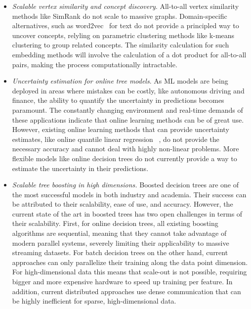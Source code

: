 \begin{itemize}
	\item \emph{Scalable vertex similarity and concept discovery}. All-to-all vertex similarity
	methods like SimRank do not scale to massive graphs. Domain-specific alternatives,
	such as word2vec~\cite{word2vec} for text do not provide a principled way to uncover
	concepts, relyling on parametric clustering methods like k-means clustering to group related
	concepts. The similarity calculation for such embedding methods will involve the
	calculation of a dot product for all-to-all pairs, making the process
	computationally intractable.

	\item \emph{Uncertainty estimation for online tree models}. As ML models are being
	deployed in areas where mistakes can be costly, like autonomous driving and finance,
	the ability to quantify the uncertainty in predictions becomes paramount. The constantly
	changing environment and real-time demands of these applications indicate that
	online learning methods can be of great use. However, existing online learning
	methods that can provide uncertainty estimates, like online quantile linear regression
	~\cite{koenker2005qr}, do not provide the necessary accuracy and cannot deal
	with highly non-linear problems. More flexible models like online decision trees
	do not currently provide a way to estimate the uncertainty in their predictions.

	\item \emph{Scalable tree boosting in high dimensions.} Boosted
	decision trees are one of the most successful models in both industry and academia.
	Their success can be attributed to their scalability, ease of use, and accuracy.
	However, the current state of the art in boosted trees has two open challenges
	in terms of their scalability.
	First, for online decision trees, all existing boosting algorithms are sequential,
	meaning that they cannot take advantage of modern parallel systems, severely limiting
	their applicability to massive streaming datasets. For batch decision trees on the other
	hand, current approaches can only parallelize their training along the data point
	dimension. For high-dimensional data this means that scale-out is not possible,
	requiring bigger and more expensive hardware to speed up training per feature.
	In addition, current distributed approaches use dense communication that can
	be highly inefficient for sparse, high-dimensional data.
\end{itemize}

